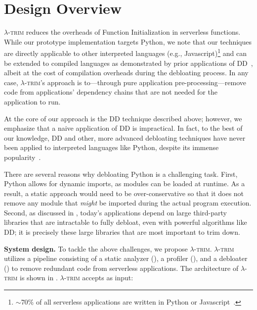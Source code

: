 \documentclass[sigplan,nonacm]{acmart}
\newcommand{\sys}{\textsc{\ensuremath{\lambda}-trim}\xspace}
\newcommand{\heading}[1]{\vspace{4pt}\noindent\textbf{#1.}}
\begin{document}
  
\section{Design Overview}\label{sec:design}









\sys reduces the overheads of Function Initialization in serverless functions.
While our prototype implementation targets Python, we note that our techniques are directly applicable to other interpreted languages (e.g., Javascript)\footnote{$\sim$70\% of all serverless applications are written in Python or Javascript~\cite{datadog-blog}.} and can be extended to compiled languages as demonstrated by prior applications of DD~\cite{delta2002,deltarl2018}, albeit at the cost of compilation overheads during the debloating process.
In any case, \sys's approach is to---through pure application pre-processing---remove code from applications' dependency chains that are not needed for the application to run.

At the core of our approach is the DD technique described above; however, we emphasize that a naive application of DD is impractical.
In fact, to the best of our knowledge, DD and other, more advanced debloating techniques have never been applied to interpreted languages like Python, despite its immense popularity~\cite{pybloat2024}.



There are several reasons why debloating Python is a challenging task.
First, Python allows for dynamic imports, as modules can be loaded at runtime.
As a result, a static approach would need to be over-conservative so that it does not remove any module that \textit{might} be imported during the actual program execution.
Second, as discussed in , today's applications depend on large third-party libraries that are intractable to fully debloat, even with powerful algorithms like DD;
it is precisely these large libraries that are most important to trim down.

\heading{System design}
To tackle the above challenges, we propose \sys.
\sys utilizes a pipeline consisting of a static analyzer (), a profiler (), and a debloater () to remove redundant code from serverless applications.
The architecture of \sys is shown in .
\sys accepts as input:
\end{document}
